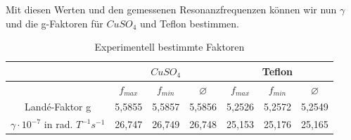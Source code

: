 Mit diesen Werten und den gemessenen Resonanzfrequenzen können wir nun $\gamma$ und die g-Faktoren für $CuSO_4$ und Teflon bestimmen. 

\begin{table}[h]
	\caption{Experimentell bestimmte Faktoren}
	\begin{tabular}{|c|c|c|c|c|c|c|}
	\hline
	& \multicolumn{3}{|c|}{$CuSO_4$} & \multicolumn{3}{|c|}{Teflon} \\ \hline
	& $f_{max}$ & $f_{min}$  & $\varnothing $  & $f_{max}$ & $f_{min}$ &  $\varnothing$ \\ \hline
	Landé-Faktor g & 5,5855 & 5,5857 & 5,5856 & 5,2526 & 5,2572 & 5,2549 \\ \hline
	$\gamma \cdot 10^{-7}$ in rad. $T^{-1} s^{-1}$& 26,747 & 26,749 & 26,748 & 25,153 & 25,176 & 25,165 \\ \hline
	\end{tabular}
\label{gammas}
\end{table}	


